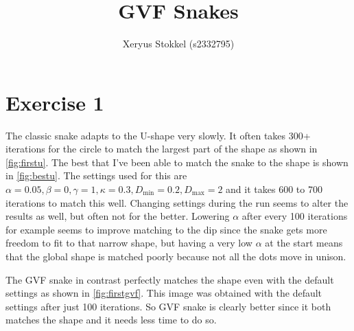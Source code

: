 \documentclass[a4paper]{article}
\title{GVF Snakes}
\author{Xeryus Stokkel (s2332795)}
\begin{document}
\maketitle

\section*{Exercise 1}
The classic snake adapts to the U-shape very slowly. It often takes 300+ iterations for the circle to match the largest part of the shape as shown in \autoref{fig:firstu}. The best that I've been able to match the snake to the shape is shown in \autoref{fig:bestu}. The settings used for this are $\alpha=0.05, \beta=0, \gamma=1, \kappa=0.3, D_\text{min}=0.2, D_\text{max}=2$ and it takes 600 to 700 iterations to match this well. Changing settings during the run seems to alter the results as well, but often not for the better. Lowering $\alpha$ after every 100 iterations for example seems to improve matching to the dip since the snake gets more freedom to fit to that narrow shape, but having a very low $\alpha$ at the start means that the global shape is matched poorly because not all the dots move in unison.

The GVF snake in contrast perfectly matches the shape even with the default settings as shown in \autoref{fig:firstgvf}. This image was obtained with the default settings after just 100 iterations. So GVF snake is clearly better since it both matches the shape and it needs less time to do so.
\end{document}
